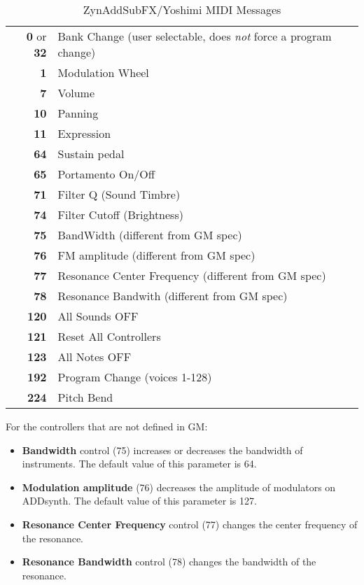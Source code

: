    \begin{table}
      \centering
      \caption{ZynAddSubFX/Yoshimi MIDI Messages}
      \label{table:zynaddsubfx_midi_messages}
      \begin{tabular}{r l}
         \textbf{0} or \textbf{32} &
            Bank Change (user selectable, does \textsl{not} force a program
            change) \\
         \textbf{1} &
            Modulation Wheel \\
         \textbf{7} &
            Volume \\
         \textbf{10} &
            Panning \\
         \textbf{11} &
            Expression \\
         \textbf{64} &
            Sustain pedal \\
         \textbf{65} &
            Portamento On/Off \\
         \textbf{71} &
            Filter Q (Sound Timbre) \\
         \textbf{74} &
            Filter Cutoff (Brightness) \\
         \textbf{75} &
            BandWidth (different from GM spec) \\
         \textbf{76} &
            FM amplitude (different from GM spec) \\
         \textbf{77} &
            Resonance Center Frequency (different from GM spec) \\
         \textbf{78} &
            Resonance Bandwith (different from GM spec) \\
         \textbf{120} &
            All Sounds OFF \\
         \textbf{121} &
            Reset All Controllers \\
         \textbf{123} &
            All Notes OFF \\
         \textbf{192} &
            Program Change (voices 1-128) \\
         \textbf{224} &
            Pitch Bend \\
      \end{tabular}
   \end{table}

   For the controllers that are not defined in GM:

   \begin{itemize}
      \item \textbf{Bandwidth} control (75) increases or decreases the bandwidth
      of instruments. The default value of this parameter is 64. 
      \item \textbf{Modulation amplitude} (76) decreases the amplitude of
      modulators on ADDsynth. The default value of this parameter is 127. 
      \item \textbf{Resonance Center Frequency} control (77) changes the center
      frequency of the resonance. 
      \item \textbf{Resonance Bandwidth} control (78) changes the bandwidth of the
      resonance. 
   \end{itemize}

